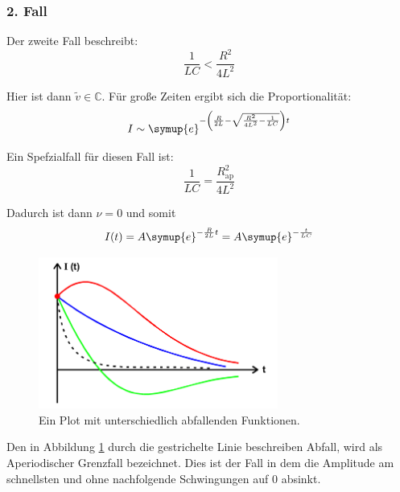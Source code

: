         \subsubsection{2. Fall}


        \noindent Der zweite Fall beschreibt:
        \begin{equation}
            \frac{1}{LC} < \frac{R^2}{4L^2} \nonumber
        \end{equation}

        \noindent Hier ist dann $\tilde{v} \in \mathds{C}$.
        Für große Zeiten ergibt sich die Proportionalität:
        \begin{equation}   
            I \sim \symup{e}^{- \left( \frac{R}{2L} - \sqrt{\frac{R^2}{4L^2} - \frac{1}{LC}}\right) t} \nonumber
        \end{equation}

        \noindent Ein Spefzialfall für diesen Fall ist:
        \begin{equation}
            \frac{1}{LC} = \frac{R^2_{\text{ap}}}{4L^2} \nonumber
        \end{equation}
        
        \noindent Dadurch ist dann $\nu = 0$ und somit
        \begin{equation}
            I(t) = A \symup{e}^{-\frac{R}{2L}t} = A \symup{e}^{-\frac{t}{LC}} \nonumber
        \end{equation}

        \begin{figure}[H]
            \centering
            \includegraphics[width=0.7\textwidth]{images/AperiodischD.PNG}
            \caption{Ein Plot mit unterschiedlich abfallenden Funktionen.}
            \label{img:aperi}
        \end{figure}

        \noindent Den in Abbildung \ref{img:aperi} durch die gestrichelte Linie beschreiben Abfall, wird als Aperiodischer Grenzfall 
        bezeichnet. Dies ist der Fall in dem die Amplitude am schnellsten und ohne nachfolgende Schwingungen auf 0 absinkt.

